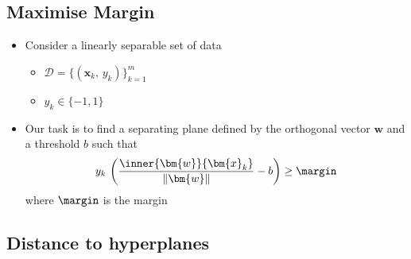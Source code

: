 
\begin{slide}
\section{Maximise Margin}

\begin{PauseHighLight}
  \begin{itemize}
  \item Consider a linearly separable set of data
    \begin{itemize}
    \item $\mathcal{D} = \{(\bm{x}_k,\,y_k)\}_{k=1}^m$
    \item $y_k\in \{-1,1\}$\pause
    \end{itemize}
  \item Our task is to find a separating plane defined by the orthogonal
    vector $\bm{w}$ and a threshold $b$ such that
    \begin{align*}
      y_k\,\left(\frac{\inner{\bm{w}}{\bm{x}_k}}{\| \bm{w} \|} - b\right)
      \geq \margin
    \end{align*}
    where $\margin$ is the margin\pause
  \end{itemize}
\end{PauseHighLight}

\end{slide}


\begin{slide}
\section[-1]{Distance to hyperplanes}

\pb\pause{}
\begin{center}
  \pause
\end{center}
\end{slide}


